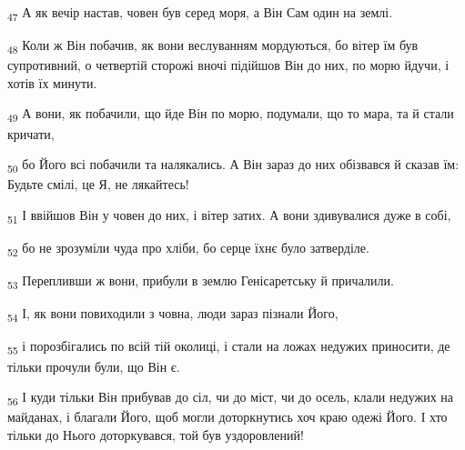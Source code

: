 \begin{tcolorbox}
\textsubscript{47} А як вечір настав, човен був серед моря, а Він Сам один на землі.
\end{tcolorbox}
\begin{tcolorbox}
\textsubscript{48} Коли ж Він побачив, як вони веслуванням мордуються, бо вітер їм був супротивний, о четвертій сторожі вночі підійшов Він до них, по морю йдучи, і хотів їх минути.
\end{tcolorbox}
\begin{tcolorbox}
\textsubscript{49} А вони, як побачили, що йде Він по морю, подумали, що то мара, та й стали кричати,
\end{tcolorbox}
\begin{tcolorbox}
\textsubscript{50} бо Його всі побачили та налякались. А Він зараз до них обізвався й сказав їм: Будьте смілі, це Я, не лякайтесь!
\end{tcolorbox}
\begin{tcolorbox}
\textsubscript{51} І ввійшов Він у човен до них, і вітер затих. А вони здивувалися дуже в собі,
\end{tcolorbox}
\begin{tcolorbox}
\textsubscript{52} бо не зрозуміли чуда про хліби, бо серце їхнє було затверділе.
\end{tcolorbox}
\begin{tcolorbox}
\textsubscript{53} Перепливши ж вони, прибули в землю Генісаретську й причалили.
\end{tcolorbox}
\begin{tcolorbox}
\textsubscript{54} І, як вони повиходили з човна, люди зараз пізнали Його,
\end{tcolorbox}
\begin{tcolorbox}
\textsubscript{55} і порозбігались по всій тій околиці, і стали на ложах недужих приносити, де тільки прочули були, що Він є.
\end{tcolorbox}
\begin{tcolorbox}
\textsubscript{56} І куди тільки Він прибував до сіл, чи до міст, чи до осель, клали недужих на майданах, і благали Його, щоб могли доторкнутись хоч краю одежі Його. І хто тільки до Нього доторкувався, той був уздоровлений!
\end{tcolorbox}
